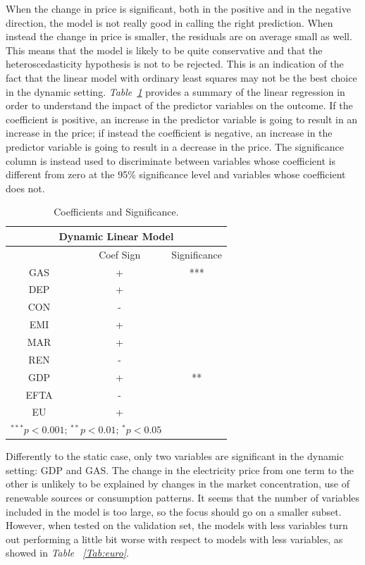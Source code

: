\documentclass[a4paper,12pt]{book}
\begin{document}
When the change in price is significant, both in the positive and in the negative direction, the model is not really good in calling the right prediction. When instead the change in price is smaller, the residuals are on average small as well. This means that the model is likely to be quite conservative and that the heteroscedasticity hypothesis is not to be rejected. This is an indication of the fact that the linear model with ordinary least squares may not be the best choice in the dynamic setting. \textit{Table~\ref{Tab:dlm}} provides a summary of the linear regression in order to understand the impact of the predictor variables on the outcome. If the coefficient is positive, an increase in the predictor variable is going to result in an increase in the price; if instead the coefficient is negative, an increase in the predictor variable is going to result in a decrease in the price. The significance column is instead used to discriminate between variables whose coefficient is different from zero at the 95\% significance level and variables whose coefficient does not.

\begin{table}[tb]
\begin{center}
\begin{tabular}{|c|c|c|}
\hline
\multicolumn{3}{|c|}{Dynamic Linear Model}\\
\hline
&Coef Sign&Significance\\
\hline
GAS&+&***\\
DEP&+&\\
CON&-&\\
EMI&+&\\
MAR&+&\\
REN&-&\\
GDP&+&**\\
EFTA&-&\\
EU&+&\\
\hline
\multicolumn{2}{l}{\scriptsize{$^{***}p<0.001$; $^{**}p<0.01$; $^{*}p<0.05$}}
\end{tabular}
\caption{Coefficients and Significance.}
\label{Tab:dlm}
\end{center}
\end{table}

Differently to the static case, only two variables are significant in the dynamic setting: GDP and GAS. The change in the electricity price from one term to the other is unlikely to be explained by changes in the market concentration, use of renewable sources or consumption patterns. It seems that the number of variables included in the model is too large, so the focus should go on a smaller subset. However, when tested on the validation set, the models with less variables turn out performing a little bit worse with respect to models with less variables, as showed in \textit{Table ~\ref{Tab:euro}}. 
\end{document}
